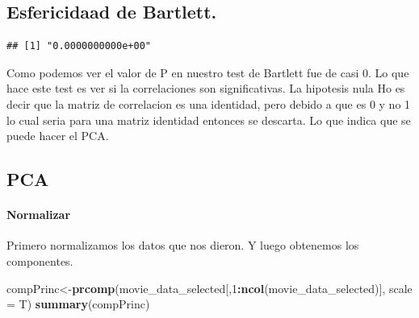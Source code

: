 \documentclass[
]{article}
\newenvironment{Shaded}{\begin{snugshade}}{\end{snugshade}}
\newcommand{\AttributeTok}[1]{\textcolor[rgb]{0.13,0.29,0.53}{#1}}
\newcommand{\CommentTok}[1]{\textcolor[rgb]{0.56,0.35,0.01}{\textit{#1}}}
\newcommand{\DecValTok}[1]{\textcolor[rgb]{0.00,0.00,0.81}{#1}}
\newcommand{\FunctionTok}[1]{\textcolor[rgb]{0.13,0.29,0.53}{\textbf{#1}}}
\newcommand{\NormalTok}[1]{#1}
\newcommand{\OtherTok}[1]{\textcolor[rgb]{0.56,0.35,0.01}{#1}}
\newcommand{\SpecialCharTok}[1]{\textcolor[rgb]{0.81,0.36,0.00}{\textbf{#1}}}
\newcommand{\StringTok}[1]{\textcolor[rgb]{0.31,0.60,0.02}{#1}}
\begin{document}
\subsection{Esfericidaad de Bartlett.}\label{esfericidaad-de-bartlett.}

\begin{Shaded}
\end{Shaded}

\begin{verbatim}
## [1] "0.0000000000e+00"
\end{verbatim}

Como podemos ver el valor de P en nuestro test de Bartlett fue de casi
0. Lo que hace este test es ver si la correlaciones son significativas.
La hipotesis nula Ho es decir que la matriz de correlacion es una
identidad, pero debido a que es 0 y no 1 lo cual seria para una matriz
identidad entonces se descarta. Lo que indica que se puede hacer el PCA.

\subsection{PCA}\label{pca-1}

\paragraph{Normalizar}\label{normalizar}

Primero normalizamos los datos que nos dieron. Y luego obtenemos los
componentes.

\begin{Shaded}
\begin{Highlighting}[]
\NormalTok{compPrinc}\OtherTok{\textless{}{-}}\FunctionTok{prcomp}\NormalTok{(movie\_data\_selected[,}\DecValTok{1}\SpecialCharTok{:}\FunctionTok{ncol}\NormalTok{(movie\_data\_selected)], }\AttributeTok{scale =}\NormalTok{ T)}
\FunctionTok{summary}\NormalTok{(compPrinc)}
\end{Highlighting}
\end{Shaded}
\end{document}
